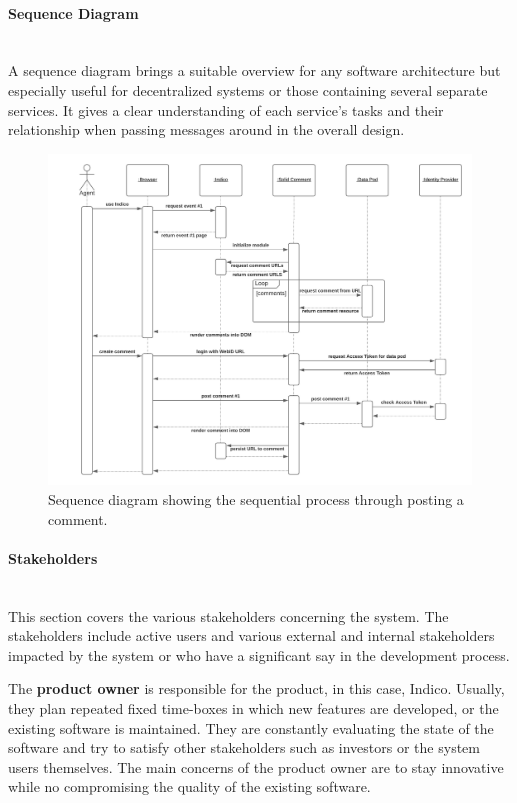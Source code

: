 \paragraph{Sequence Diagram}\mbox{}\\

A sequence diagram brings a suitable overview for any software architecture but especially useful for decentralized systems or those containing several separate services. It gives a clear understanding of each service’s tasks and their relationship when passing messages around in the overall design.

\begin{figure}[H]
    \centering
    \includegraphics[width=\textwidth]{prototype/graphs/poc-comment-sequence_diagram.png}
    \caption{Sequence diagram showing the sequential process through posting a comment.}
    \label{fig:poc-comment-sequence_diagram}
\end{figure}
\vspace{0.5cm}
\paragraph{Stakeholders}\label{poc1-stakeholders}\mbox{}\\

This section covers the various stakeholders concerning the system. The stakeholders include active users and various external and internal stakeholders impacted by the system or who have a significant say in the development process.

The \textbf{product owner} is responsible for the product, in this case, Indico. Usually, they plan repeated fixed time-boxes in which new features are developed, or the existing software is maintained. They are constantly evaluating the state of the software and try to satisfy other stakeholders such as investors or the system users themselves. The main concerns of the product owner are to stay innovative while no compromising the quality of the existing software.

